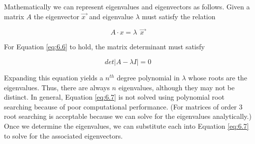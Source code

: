 Mathematically we can represent eigenvalues and eigenvectors as follows. Given a matrix $A$ the eigenvector $\overrightarrow{x\ }$ and eigenvalue $\lambda$ must satisfy the relation 

\begin{equation}\label{eq:6.6}
A \cdot x = \lambda\ \  \overrightarrow{x\ }
\end{equation}

For Equation \ref{eq:6.6} to hold, the matrix determinant must satisfy

\begin{equation}\label{eq:6.7}
det |A-\lambda I| = 0
\end{equation}

Expanding this equation yields a $n^{th}$ degree polynomial in $\lambda$ whose roots are the eigenvalues. Thus, there are always $n$ eigenvalues, although they may not be distinct. In general, Equation \ref{eq:6.7} is not solved using polynomial root searching because of poor computational performance. (For matrices of order 3 root searching is acceptable because we can solve for the eigenvalues analytically.) Once we determine the eigenvalues, we can substitute each into Equation \ref{eq:6.7} to solve for the associated eigenvectors.


